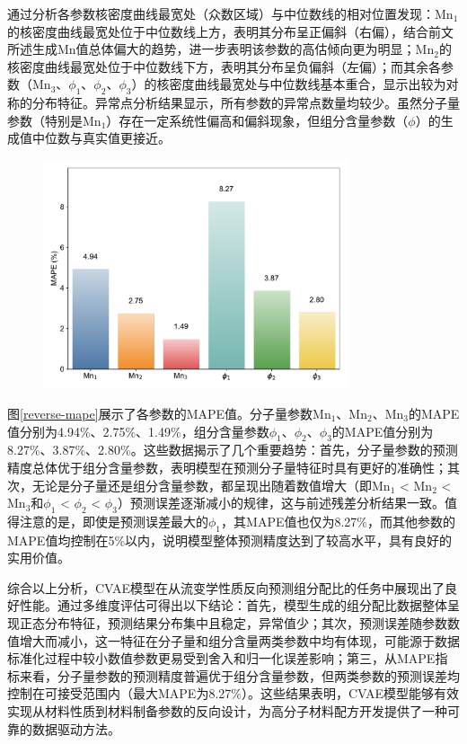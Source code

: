 通过分析各参数核密度曲线最宽处（众数区域）与中位数线的相对位置发现：Mn$_1$的核密度曲线最宽处位于中位数线上方，表明其分布呈正偏斜（右偏），结合前文所述生成Mn值总体偏大的趋势，进一步表明该参数的高估倾向更为明显；Mn$_2$的核密度曲线最宽处位于中位数线下方，表明其分布呈负偏斜（左偏）；而其余各参数（Mn$_3$、$\phi_1$、$\phi_2$、$\phi_3$）的核密度曲线最宽处与中位数线基本重合，显示出较为对称的分布特征。异常点分析结果显示，所有参数的异常点数量均较少。虽然分子量参数（特别是Mn$_1$）存在一定系统性偏高和偏斜现象，但组分含量参数（$\phi$）的生成值中位数与真实值更接近。
\begin{figure}[htbp]
  \centering
  \includegraphics[width=0.8\textwidth]{Fig/MAPE_bar_chart.pdf}
\end{figure}

图\ref{reverse-mape}展示了各参数的MAPE值。分子量参数Mn$_1$、Mn$_2$、Mn$_3$的MAPE值分别为4.94\%、2.75\%、1.49\%，组分含量参数$\phi_1$、$\phi_2$、$\phi_3$的MAPE值分别为8.27\%、3.87\%、2.80\%。这些数据揭示了几个重要趋势：首先，分子量参数的预测精度总体优于组分含量参数，表明模型在预测分子量特征时具有更好的准确性；其次，无论是分子量还是组分含量参数，都呈现出随着数值增大（即Mn$_1$ < Mn$_2$ < Mn$_3$和$\phi_1$ < $\phi_2$ < $\phi_3$）预测误差逐渐减小的规律，这与前述残差分析结果一致。值得注意的是，即使是预测误差最大的$\phi_1$，其MAPE值也仅为8.27\%，而其他参数的MAPE值均控制在5\%以内，说明模型整体预测精度达到了较高水平，具有良好的实用价值。

综合以上分析，CVAE模型在从流变学性质反向预测组分配比的任务中展现出了良好性能。通过多维度评估可得出以下结论：首先，模型生成的组分配比数据整体呈现正态分布特征，预测结果分布集中且稳定，异常值少；其次，预测误差随参数数值增大而减小，这一特征在分子量和组分含量两类参数中均有体现，可能源于数据标准化过程中较小数值参数更易受到舍入和归一化误差影响；第三，从MAPE指标来看，分子量参数的预测精度普遍优于组分含量参数，但两类参数的预测误差均控制在可接受范围内（最大MAPE为8.27\%）。这些结果表明，CVAE模型能够有效实现从材料性质到材料制备参数的反向设计，为高分子材料配方开发提供了一种可靠的数据驱动方法。


